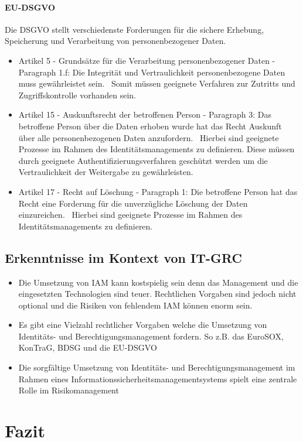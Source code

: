 \documentclass[12pt]{article}
\begin{document}
\paragraph{EU-DSGVO}
Die DSGVO stellt verschiedenste Forderungen für die sichere Erhebung, Speicherung und Verarbeitung von personenbezogener Daten.~\cite{Hindle_2020}
\begin{itemize}
  \item Artikel 5 - Grundsätze für die Verarbeitung personenbezogener Daten - Paragraph 1.f: Die Integrität und Vertraulichkeit personenbezogene Daten muss gewährleistet sein.~\cite{eu2016} Somit müssen geeignete Verfahren zur Zutritts und Zugriffskontrolle vorhanden sein.
  \item Artikel 15 - Auskunftsrecht der betroffenen Person - Paragraph 3: Das betroffene Person über die Daten erhoben wurde hat das Recht Auskunft über alle personenbezogenen Daten anzufordern.~\cite{eu2016} Hierbei sind geeignete Prozesse im Rahmen des Identitätsmanagements zu definieren. Diese müssen durch geeignete Authentifizierungsverfahren geschützt werden um die Vertraulichkeit der Weitergabe zu gewährleisten.
  \item Artikel 17 - Recht auf Löschung - Paragraph 1: Die betroffene Person hat das Recht eine Forderung für die unverzügliche Löschung der Daten einzureichen.~\cite{eu2016} Hierbei sind geeignete Prozesse im Rahmen des Identitätsmanagements zu definieren.
\end{itemize}
\subsection{Erkenntnisse im Kontext von IT-GRC}
\begin{itemize}
  \item Die Umsetzung von IAM kann kostspielig sein denn das Management und die eingesetzten Technologien sind teuer. Rechtlichen Vorgaben sind jedoch nicht optional und die Risiken von fehlendem IAM können enorm sein.
  \item Es gibt eine Vielzahl rechtlicher Vorgaben welche die Umsetzung von Identitäts- und Berechtigungsmanagement fordern. So z.B. das EuroSOX, KonTraG, BDSG und die EU-DSGVO
  \item Die sorgfältige Umsetzung von Identitäts- und Berechtigungsmanagement im Rahmen eines Informationssicherheitsmanagementsystems spielt eine zentrale Rolle im Risikomanagement
\end{itemize}
\section{Fazit}
\end{document}
